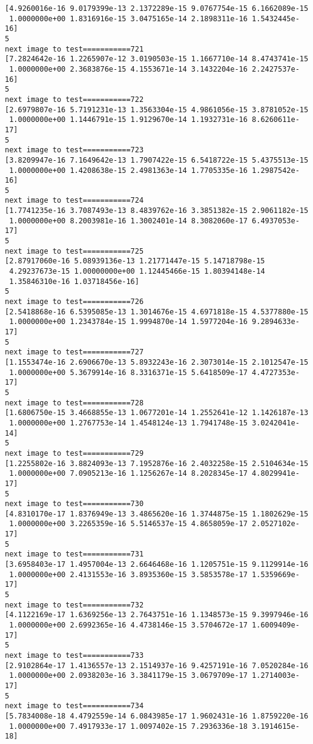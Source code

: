\documentclass[11pt]{article}
\begin{document}
\begin{Verbatim}[commandchars=\\\{\}]
[4.9260016e-16 9.0179399e-13 2.1372289e-15 9.0767754e-15 6.1662089e-15
 1.0000000e+00 1.8316916e-15 3.0475165e-14 2.1898311e-16 1.5432445e-16]
5
next image to test===========721
[7.2824642e-16 1.2265907e-12 3.0190503e-15 1.1667710e-14 8.4743741e-15
 1.0000000e+00 2.3683876e-15 4.1553671e-14 3.1432204e-16 2.2427537e-16]
5
next image to test===========722
[2.6979807e-16 5.7191231e-13 1.3563304e-15 4.9861056e-15 3.8781052e-15
 1.0000000e+00 1.1446791e-15 1.9129670e-14 1.1932731e-16 8.6260611e-17]
5
next image to test===========723
[3.8209947e-16 7.1649642e-13 1.7907422e-15 6.5418722e-15 5.4375513e-15
 1.0000000e+00 1.4208638e-15 2.4981363e-14 1.7705335e-16 1.2987542e-16]
5
next image to test===========724
[1.7741235e-16 3.7087493e-13 8.4839762e-16 3.3851382e-15 2.9061182e-15
 1.0000000e+00 8.2003981e-16 1.3002401e-14 8.3082060e-17 6.4937053e-17]
5
next image to test===========725
[2.87917060e-16 5.08939136e-13 1.21771447e-15 5.14718798e-15
 4.29237673e-15 1.00000000e+00 1.12445466e-15 1.80394148e-14
 1.35846310e-16 1.03718456e-16]
5
next image to test===========726
[2.5418868e-16 6.5395085e-13 1.3014676e-15 4.6971818e-15 4.5377880e-15
 1.0000000e+00 1.2343784e-15 1.9994870e-14 1.5977204e-16 9.2894633e-17]
5
next image to test===========727
[1.1553474e-16 2.6906670e-13 5.8932243e-16 2.3073014e-15 2.1012547e-15
 1.0000000e+00 5.3679914e-16 8.3316371e-15 5.6418509e-17 4.4727353e-17]
5
next image to test===========728
[1.6806750e-15 3.4668855e-13 1.0677201e-14 1.2552641e-12 1.1426187e-13
 1.0000000e+00 1.2767753e-14 1.4548124e-13 1.7941748e-15 3.0242041e-14]
5
next image to test===========729
[1.2255802e-16 3.8824093e-13 7.1952876e-16 2.4032258e-15 2.5104634e-15
 1.0000000e+00 7.0905213e-16 1.1256267e-14 8.2028345e-17 4.8029941e-17]
5
next image to test===========730
[4.8310170e-17 1.8376949e-13 3.4865620e-16 1.3744875e-15 1.1802629e-15
 1.0000000e+00 3.2265359e-16 5.5146537e-15 4.8658059e-17 2.0527102e-17]
5
next image to test===========731
[3.6958403e-17 1.4957004e-13 2.6646468e-16 1.1205751e-15 9.1129914e-16
 1.0000000e+00 2.4131553e-16 3.8935360e-15 3.5853578e-17 1.5359669e-17]
5
next image to test===========732
[4.1122169e-17 1.6369256e-13 2.7643751e-16 1.1348573e-15 9.3997946e-16
 1.0000000e+00 2.6992365e-16 4.4738146e-15 3.5704672e-17 1.6009409e-17]
5
next image to test===========733
[2.9102864e-17 1.4136557e-13 2.1514937e-16 9.4257191e-16 7.0520284e-16
 1.0000000e+00 2.0938203e-16 3.3841179e-15 3.0679709e-17 1.2714003e-17]
5
next image to test===========734
[5.7834008e-18 4.4792559e-14 6.0843985e-17 1.9602431e-16 1.8759220e-16
 1.0000000e+00 7.4917933e-17 1.0097402e-15 7.2936336e-18 3.1914615e-18]

\end{Verbatim}
\end{document}
